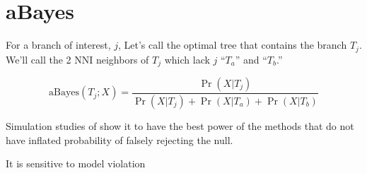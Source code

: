 \documentclass[landscape]{foils}
\begin{document}
\myNewSlide
\section*{aBayes \citet{AnisimovaGDDG2011} }

For a branch of interest, $j$, Let's call the optimal tree that contains the branch $T_j$.
We'll call the 2 NNI neighbors of $T_j$  which lack $j$ ``$T_a$'' and ``$T_b$.''

$$\mbox{aBayes}(T_j;X) = \frac{\Pr(X|T_j)}{\Pr(X|T_j) + \Pr(X|T_a) + \Pr(X|T_b)}$$

Simulation studies of \citet{AnisimovaGDDG2011} show it to have the best power of the methods that do not have inflated probability of falsely rejecting the null.

It is sensitive to model violation



\myNewSlide
\normalsize

\end{document}
